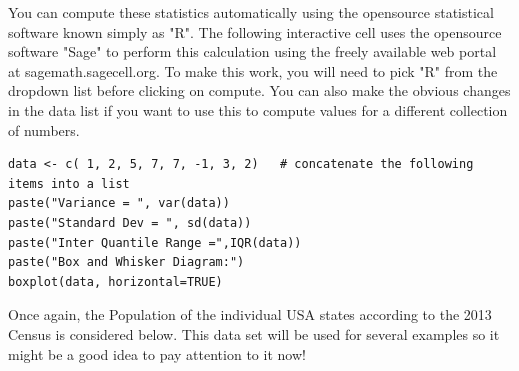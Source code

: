 \documentclass[10pt,]{book}
\theoremstyle{plain}
\theoremstyle{definition}
\theoremstyle{definition}
\theoremstyle{definition}
\numberwithin{equation}{section}
\begin{document}
You can compute these statistics automatically using the opensource statistical software known simply as "R".  The following interactive cell uses the opensource software "Sage" to perform this calculation using the freely available web portal at sagemath.sagecell.org.  To make this work, you will need to pick "R" from the dropdown list before clicking on compute. You can also make the obvious changes in the data list if you want to use this to compute values for a different collection of numbers.
%
\begin{lstlisting}[style=sageinput]
data <- c( 1, 2, 5, 7, 7, -1, 3, 2)   # concatenate the following items into a list
paste("Variance = ", var(data))
paste("Standard Dev = ", sd(data))
paste("Inter Quantile Range =",IQR(data))
paste("Box and Whisker Diagram:")
boxplot(data, horizontal=TRUE)
\end{lstlisting}
\par
Once again, the Population of the individual USA states according to the 2013 Census is considered below. This data set will be used for several examples so it might be a good idea to pay attention to it now!%
\end{document}

